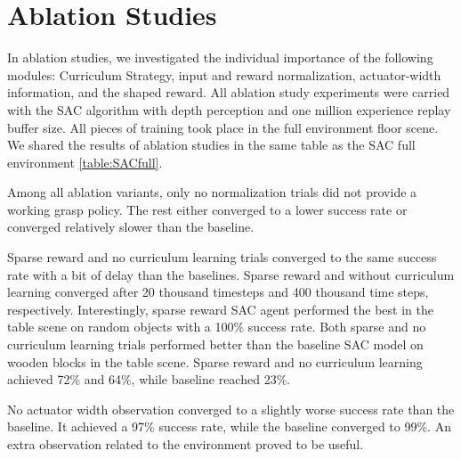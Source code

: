 \section{Ablation Studies}

In ablation studies, we investigated the individual importance of the following modules: Curriculum Strategy, input and reward normalization, actuator-width information, and the shaped reward. All ablation study experiments were carried with the SAC algorithm with depth perception and one million experience replay buffer size. All pieces of training took place in the full environment floor scene. We shared the results of ablation studies in the same table as the SAC full environment \ref{table:SACfull}.

Among all ablation variants, only no normalization trials did not provide a working grasp policy. The rest either converged to a lower success rate or converged relatively slower than the baseline. 

Sparse reward and no curriculum learning trials converged to the same success rate with a bit of delay than the baselines. Sparse reward and without curriculum learning converged after 20 thousand timesteps and 400 thousand time steps, respectively. Interestingly, sparse reward SAC agent performed the best in the table scene on random objects with a 100\% success rate. Both sparse and no curriculum learning trials performed better than the baseline SAC model on wooden blocks in the table scene. Sparse reward and no curriculum learning achieved 72\% and 64\%, while baseline reached 23\%.

No actuator width observation converged to a slightly worse success rate than the baseline.  It achieved a 97\% success rate, while the baseline converged to 99\%. An extra observation related to the environment proved to be useful.

